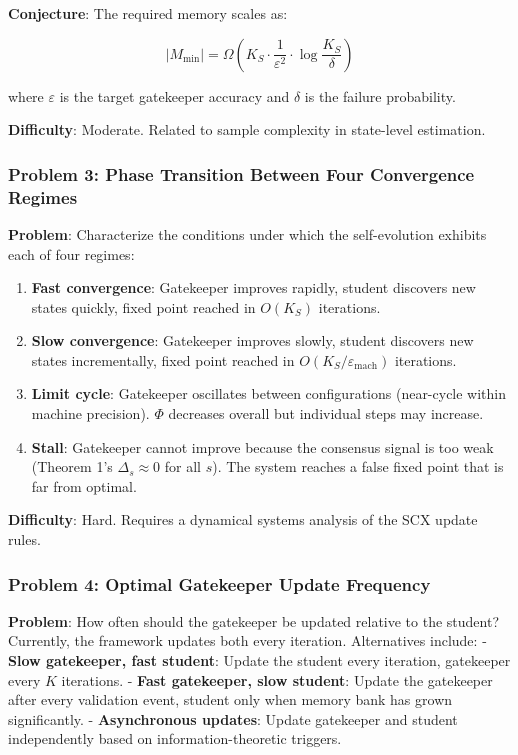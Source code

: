 \documentclass[
  12pt,
]{ctexart}
\providecommand{\tightlist}{%
  \setlength{\itemsep}{0pt}\setlength{\parskip}{0pt}}
\begin{document}
\textbf{Conjecture}: The required memory scales as:

\[|M_{\min}| = \Omega\left(K_S \cdot \frac{1}{\varepsilon^2} \cdot \log\frac{K_S}{\delta}\right)\]

where \(\varepsilon\) is the target gatekeeper accuracy and \(\delta\)
is the failure probability.

\textbf{Difficulty}: Moderate. Related to sample complexity in
state-level estimation.

\subsubsection{Problem 3: Phase Transition Between Four Convergence
Regimes}\label{problem-3-phase-transition-between-four-convergence-regimes}

\textbf{Problem}: Characterize the conditions under which the
self-evolution exhibits each of four regimes:

\begin{enumerate}
\def\labelenumi{\arabic{enumi}.}
\tightlist
\item
  \textbf{Fast convergence}: Gatekeeper improves rapidly, student
  discovers new states quickly, fixed point reached in \(O(K_S)\)
  iterations.
\item
  \textbf{Slow convergence}: Gatekeeper improves slowly, student
  discovers new states incrementally, fixed point reached in
  \(O(K_S/\varepsilon_{\text{mach}})\) iterations.
\item
  \textbf{Limit cycle}: Gatekeeper oscillates between configurations
  (near-cycle within machine precision). \(\Phi\) decreases overall but
  individual steps may increase.
\item
  \textbf{Stall}: Gatekeeper cannot improve because the consensus signal
  is too weak (Theorem 1's \(\Delta_s \approx 0\) for all \(s\)). The
  system reaches a false fixed point that is far from optimal.
\end{enumerate}

\textbf{Difficulty}: Hard. Requires a dynamical systems analysis of the
SCX update rules.

\subsubsection{Problem 4: Optimal Gatekeeper Update
Frequency}\label{problem-4-optimal-gatekeeper-update-frequency}

\textbf{Problem}: How often should the gatekeeper be updated relative to
the student? Currently, the framework updates both every iteration.
Alternatives include: - \textbf{Slow gatekeeper, fast student}: Update
the student every iteration, gatekeeper every \(K\) iterations. -
\textbf{Fast gatekeeper, slow student}: Update the gatekeeper after
every validation event, student only when memory bank has grown
significantly. - \textbf{Asynchronous updates}: Update gatekeeper and
student independently based on information-theoretic triggers.
\end{document}
